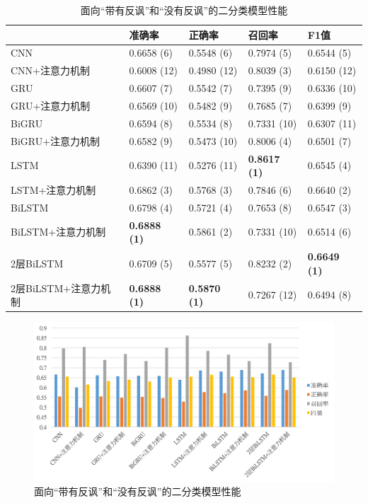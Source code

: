 \begin{table}[htb]
  \centering
  \begin{minipage}[t]{\linewidth}
  \caption{面向“带有反讽”和“没有反讽”的二分类模型性能}
  \label{tab:exp_irony_det_A_single_result}
    \begin{tabularx}{\linewidth}{X|llll}
    \toprule[1.5pt]
    & 准确率 & 正确率 & 召回率 & F1值 \\
    \hline
    CNN & 0.6658 (6) & 0.5548 (6) & 0.7974 (5) & 0.6544 (5) \\ %
    CNN+注意力机制 & 0.6008 (12) & 0.4980 (12) & 0.8039 (3) & 0.6150 (12) \\  %
    \hline
    GRU & 0.6607 (7) & 0.5542 (7) & 0.7395 (9) & 0.6336 (10) \\ %
    GRU+注意力机制 & 0.6569 (10) & 0.5482 (9) & 0.7685 (7) & 0.6399 (9) \\ %
    \hline
    BiGRU & 0.6594 (8) & 0.5534 (8) & 0.7331 (10) & 0.6307 (11) \\ %
    BiGRU+注意力机制 & 0.6582 (9) & 0.5473 (10) & 0.8006 (4) & 0.6501 (7) \\ %
    \hline
    LSTM & 0.6390 (11) & 0.5276 (11) & \bf 0.8617 (1) & 0.6545 (4) \\ %
    LSTM+注意力机制 & 0.6862 (3) & 0.5768 (3) & 0.7846 (6) & 0.6640 (2) \\ %
    \hline
    BiLSTM & 0.6798 (4) & 0.5721 (4) & 0.7653 (8) & 0.6547 (3) \\ %
    BiLSTM+注意力机制 & \bf 0.6888 (1) & 0.5861 (2) & 0.7331 (10) & 0.6514 (6) \\ %
    \hline
    2层BiLSTM & 0.6709 (5) & 0.5577 (5) & 0.8232 (2) & \bf 0.6649 (1) \\ %
    2层BiLSTM+注意力机制 & \bf 0.6888 (1) & \bf 0.5870 (1) & 0.7267 (12) & 0.6494 (8) \\ %
    \bottomrule[1.5pt]
    \end{tabularx}
  \end{minipage}
\end{table}

\begin{figure}[H]
  \centering
  \includegraphics[width=\textwidth]{img/exp_irony_det_A_single_result_bar.png}
  \caption{面向“带有反讽”和“没有反讽”的二分类模型性能}
  \label{fig:exp_irony_det_A_single_result_bar}
\end{figure}

